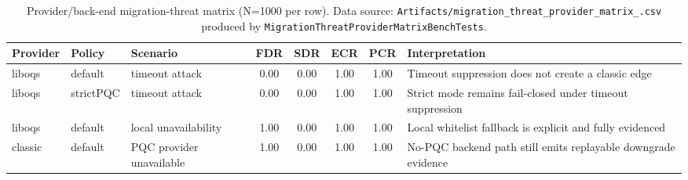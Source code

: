 \begin{table}[!t]
\centering
\scriptsize
\caption{Provider/back-end migration-threat matrix (N=1000 per row). Data source: \texttt{Artifacts/\allowbreak migration\_threat\_provider\_matrix\_\artifactdate.csv} produced by \texttt{MigrationThreatProviderMatrixBenchTests}.}
\label{tab:migration-provider-matrix}
\begin{tabular}{@{}
  >{\raggedright\arraybackslash}p{}
  >{\raggedright\arraybackslash}p{}
  >{\raggedright\arraybackslash}p{}
  c
  c
  c
  c
  >{\raggedright\arraybackslash}p{}@{}}
\toprule
Provider & Policy & Scenario & FDR & SDR & ECR & PCR & Interpretation \\
\midrule
liboqs & default & timeout attack & 0.00 & 0.00 & 1.00 & 1.00 & Timeout suppression does not create a classic edge \\
liboqs & strictPQC & timeout attack & 0.00 & 0.00 & 1.00 & 1.00 & Strict mode remains fail-closed under timeout suppression \\
liboqs & default & local unavailability & 1.00 & 0.00 & 1.00 & 1.00 & Local whitelist fallback is explicit and fully evidenced \\
classic & default & PQC provider unavailable & 1.00 & 0.00 & 1.00 & 1.00 & No-PQC backend path still emits replayable downgrade evidence \\
\bottomrule
\end{tabular}
\end{table}

